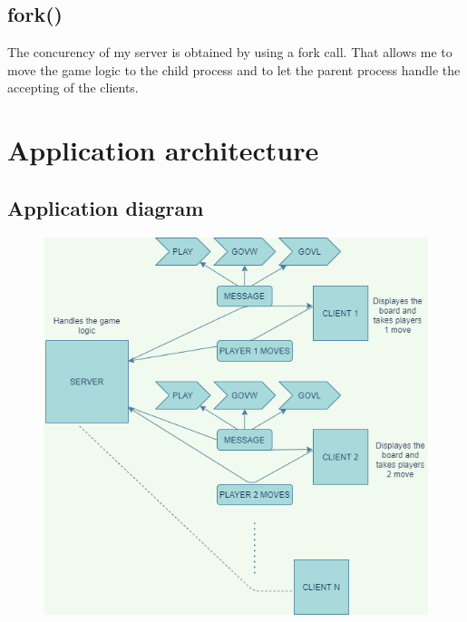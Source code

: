 \documentclass{article}
\begin{document}
\subsection{fork()}
The concurency of my server is obtained by using a fork call. That allows me to move the game logic to the child process and to let the parent process handle the accepting of the clients.

\section{Application architecture}

\subsection{Application diagram}
\begin{figure}[h!]
    \centering
    \includegraphics[width=\textwidth,height=\textheight,keepaspectratio]{appDiagram.png}
\end{figure}
\end{document}
